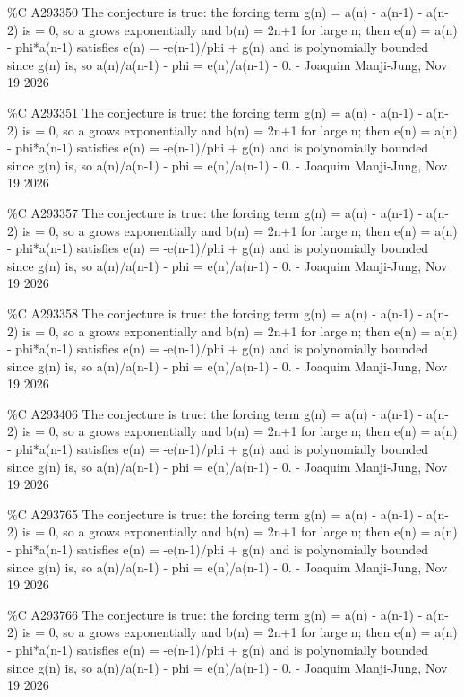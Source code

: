 {\%C A293350 The conjecture is true: the forcing term g(n) = a(n) - a(n-1) - a(n-2) is = 0, so a grows exponentially and b(n) = 2n+1 for large n; then e(n) = a(n) - phi*a(n-1) satisfies e(n) = -e(n-1)/phi + g(n) and is polynomially bounded since g(n) is, so a(n)/a(n-1) - phi = e(n)/a(n-1) - 0. - Joaquim Manji-Jung, Nov 19 2026\par
\%C A293351 The conjecture is true: the forcing term g(n) = a(n) - a(n-1) - a(n-2) is = 0, so a grows exponentially and b(n) = 2n+1 for large n; then e(n) = a(n) - phi*a(n-1) satisfies e(n) = -e(n-1)/phi + g(n) and is polynomially bounded since g(n) is, so a(n)/a(n-1) - phi = e(n)/a(n-1) - 0. - Joaquim Manji-Jung, Nov 19 2026\par
\%C A293357 The conjecture is true: the forcing term g(n) = a(n) - a(n-1) - a(n-2) is = 0, so a grows exponentially and b(n) = 2n+1 for large n; then e(n) = a(n) - phi*a(n-1) satisfies e(n) = -e(n-1)/phi + g(n) and is polynomially bounded since g(n) is, so a(n)/a(n-1) - phi = e(n)/a(n-1) - 0. - Joaquim Manji-Jung, Nov 19 2026\par
\%C A293358 The conjecture is true: the forcing term g(n) = a(n) - a(n-1) - a(n-2) is = 0, so a grows exponentially and b(n) = 2n+1 for large n; then e(n) = a(n) - phi*a(n-1) satisfies e(n) = -e(n-1)/phi + g(n) and is polynomially bounded since g(n) is, so a(n)/a(n-1) - phi = e(n)/a(n-1) - 0. - Joaquim Manji-Jung, Nov 19 2026\par
\%C A293406 The conjecture is true: the forcing term g(n) = a(n) - a(n-1) - a(n-2) is = 0, so a grows exponentially and b(n) = 2n+1 for large n; then e(n) = a(n) - phi*a(n-1) satisfies e(n) = -e(n-1)/phi + g(n) and is polynomially bounded since g(n) is, so a(n)/a(n-1) - phi = e(n)/a(n-1) - 0. - Joaquim Manji-Jung, Nov 19 2026\par
\%C A293765 The conjecture is true: the forcing term g(n) = a(n) - a(n-1) - a(n-2) is = 0, so a grows exponentially and b(n) = 2n+1 for large n; then e(n) = a(n) - phi*a(n-1) satisfies e(n) = -e(n-1)/phi + g(n) and is polynomially bounded since g(n) is, so a(n)/a(n-1) - phi = e(n)/a(n-1) - 0. - Joaquim Manji-Jung, Nov 19 2026\par
\%C A293766 The conjecture is true: the forcing term g(n) = a(n) - a(n-1) - a(n-2) is = 0, so a grows exponentially and b(n) = 2n+1 for large n; then e(n) = a(n) - phi*a(n-1) satisfies e(n) = -e(n-1)/phi + g(n) and is polynomially bounded since g(n) is, so a(n)/a(n-1) - phi = e(n)/a(n-1) - 0. - Joaquim Manji-Jung, Nov 19 2026\par
}
